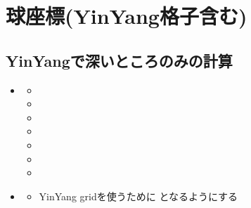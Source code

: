 \documentclass[letterpaper,10pt,dvipdfmx,report]{sphinxmanual}
\begin{document}
\section{球座標(Yin\sphinxhyphen{}Yang格子含む)}
\label{\detokenize{typical_case:yin-yang}}

\subsection{Yin\sphinxhyphen{}Yangで深いところのみの計算}
\label{\detokenize{typical_case:id12}}\begin{itemize}
\item {} \begin{description}
\begin{itemize}
\item {} 
\sphinxAtStartPar
{}

\item {} 
\sphinxAtStartPar
{}

\item {} 
\sphinxAtStartPar
{}

\item {} 
\sphinxAtStartPar
{}

\item {} 
\sphinxAtStartPar
{}

\item {} 
\sphinxAtStartPar
{}

\item {} 
\sphinxAtStartPar
{}

\end{itemize}

\end{description}

\item {} \begin{description}
\begin{itemize}
\item {} 
\sphinxAtStartPar
Yin\sphinxhyphen{}Yang gridを使うために  となるようにする

\end{itemize}

\end{description}

\end{itemize}
\end{document}
